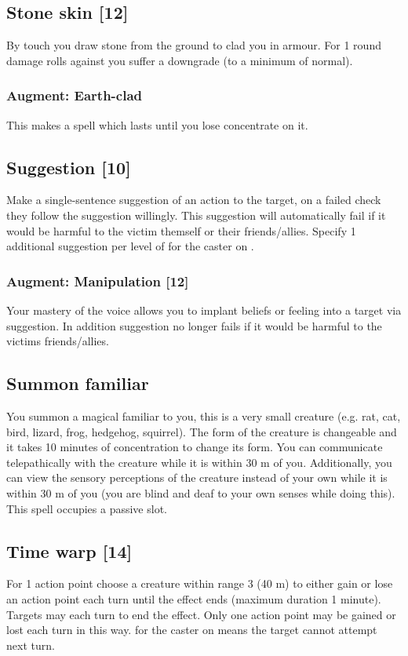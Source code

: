 \subsection{Stone skin [12]}
By touch you draw stone from the ground to clad you in armour. For 1 round damage rolls against you suffer a  downgrade (to a minimum of normal). 
\subsubsection{Augment: Earth-clad}
This makes  a  spell which lasts until you lose concentrate on it.


\subsection{Suggestion [10]}
Make a single-sentence suggestion of an action to the target, on a failed  check they follow the suggestion willingly. This suggestion will automatically fail if it would
be harmful to the victim themself or their friends/allies. Specify 1 additional suggestion per level of  for the caster on . 		
\subsubsection{Augment: Manipulation [12]}
Your mastery of the voice allows you to implant beliefs or feeling into a target via suggestion. In addition suggestion no longer fails if it would be harmful to the victims friends/allies.


\subsection{Summon familiar}
\label{spell:familiar}
You summon a magical familiar to you, this is a very small creature (e.g. rat, cat, bird, lizard, frog, hedgehog, squirrel). The form of the creature is changeable and it takes 10 minutes of concentration to change its form. You can communicate telepathically with the creature while it is within 30 m of you. Additionally, you can view the sensory perceptions of the creature instead of your own while it is within 30 m of you (you are blind and deaf to your own senses while doing this). This spell occupies a passive  slot.


\subsection{Time warp [14]}
For 1 action point choose a creature within range 3 (40 m) to either gain or lose an action point each turn until the effect ends (maximum duration 1 minute). Targets may  each turn to end the effect. Only one action point may be gained or lost each turn in this way.  for the caster on  means the target cannot attempt  next turn.
